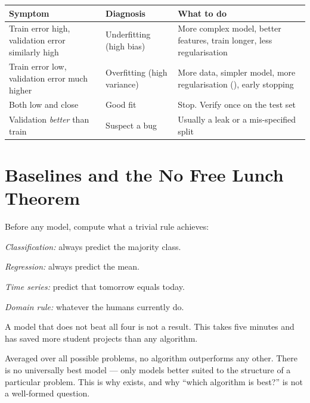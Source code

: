 \begin{longtable}{@{}L{3.4cm}L{5.0cm}L{5.9cm}@{}}
\toprule
{}
\textbf{Symptom} & \textbf{Diagnosis} & \textbf{What to do} \\
\midrule
\endhead
Train error high, validation error similarly high & Underfitting (high bias) & More complex model, better features, train longer, less regularisation \\
Train error low, validation error much higher & Overfitting (high variance) & More data, simpler model, more regularisation (), early stopping \\
Both low and close & Good fit & Stop. Verify once on the test set \\
Validation \emph{better} than train & Suspect a bug & Usually a leak or a mis-specified split \\
\bottomrule
\end{longtable}

\section{Baselines and the No Free Lunch Theorem}

\begin{conceptbox}
Before any model, compute what a trivial rule achieves:
\begin{tight}
  \item \emph{Classification:} always predict the majority class.
  \item \emph{Regression:} always predict the mean.
  \item \emph{Time series:} predict that tomorrow equals today.
  \item \emph{Domain rule:} whatever the humans currently do.
\end{tight}
A model that does not beat all four is not a result. This takes five minutes and
has saved more student projects than any algorithm.
\end{conceptbox}

\begin{definitionbox}
Averaged over all possible problems, no algorithm outperforms any other. There is
no universally best model --- only models better suited to the structure of a
particular problem. This is why  exists, and why ``which
algorithm is best?'' is not a well-formed question.
\end{definitionbox}

